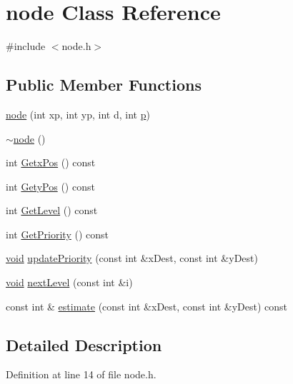 \hypertarget{classnode}{}\section{node Class Reference}
\label{classnode}


{\ttfamily \#include $<$node.\+h$>$}

\subsection*{Public Member Functions}
\begin{DoxyCompactItemize}
\item 
\mbox{\hyperlink{classnode_a802701cab6639590de6f16136184c2de}{node}} (int xp, int yp, int d, int \mbox{\hyperlink{glad_8h_aa5367c14d90f462230c2611b81b41d23}{p}})
\item 
\mbox{\hyperlink{classnode_a482f83436a89f09d289b26144d817adf}{$\sim$node}} ()
\item 
int \mbox{\hyperlink{classnode_a32e22b8a1fb6be6efa7348cc848600cf}{Getx\+Pos}} () const
\item 
int \mbox{\hyperlink{classnode_a0d644ed02899013bdc6e222afefb4c25}{Gety\+Pos}} () const
\item 
int \mbox{\hyperlink{classnode_a8f168b85b9bdf0a837f5070e5af6f009}{Get\+Level}} () const
\item 
int \mbox{\hyperlink{classnode_afa8c64a3cf2d61348b69b7e68233aa8d}{Get\+Priority}} () const
\item 
\mbox{\hyperlink{glad_8h_a950fc91edb4504f62f1c577bf4727c29}{void}} \mbox{\hyperlink{classnode_ad51b92de008bd5107a7b55cc61fc497b}{update\+Priority}} (const int \&x\+Dest, const int \&y\+Dest)
\item 
\mbox{\hyperlink{glad_8h_a950fc91edb4504f62f1c577bf4727c29}{void}} \mbox{\hyperlink{classnode_a04a186013c42fb942b6da90d2e98d4ed}{next\+Level}} (const int \&i)
\item 
const int \& \mbox{\hyperlink{classnode_acd0a1c2330a9984fa120fe7a6f169680}{estimate}} (const int \&x\+Dest, const int \&y\+Dest) const
\end{DoxyCompactItemize}


\subsection{Detailed Description}


Definition at line 14 of file node.\+h.



